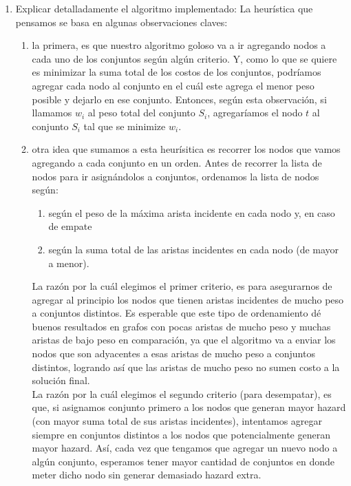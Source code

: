 \documentclass[11pt, a4paper, twoside]{article}
\begin{document}
    \begin{enumerate}
		\item Explicar detalladamente el algoritmo implementado:
		La heurística que pensamos se basa en algunas observaciones claves: 
		\begin{enumerate}
			\item la primera, es que nuestro
			algoritmo goloso va a ir agregando nodos a cada uno de los conjuntos según algún criterio. Y,
			como lo que se quiere es minimizar la suma total de los costos de los conjuntos, podríamos agregar
			cada nodo al conjunto en el cuál este agrega el menor peso posible y dejarlo en ese conjunto. 
			Entonces, según esta observación,
			si llamamos $w_{i}$ al peso total del conjunto $S_{i}$, 
			agregaríamos el nodo $t$ al conjunto $S_{i}$ tal que se minimize $w_{i}$.
						
			\item otra idea que sumamos a esta heurísitica es recorrer los nodos que vamos agregando a
			cada conjunto en un orden. Antes de recorrer la lista de nodos para ir asignándolos a conjuntos,
			ordenamos la lista de nodos según: 
			\begin{enumerate}
				\item según el peso de la máxima arista incidente en cada nodo y, en caso de empate
				\item según la suma total de las aristas incidentes en cada nodo (de mayor a menor).
			\end{enumerate}
			La razón por la cuál elegimos el primer criterio, es para asegurarnos de agregar al principio los nodos
			que tienen aristas incidentes de mucho peso a conjuntos distintos.
			Es esperable que este tipo de ordenamiento dé buenos resultados en grafos con pocas aristas de mucho
			peso y muchas aristas de bajo peso en comparación, ya que el algoritmo va a enviar los nodos 
			que son adyacentes a esas aristas de mucho peso a conjuntos distintos, logrando así que las aristas de
			mucho peso no sumen costo a la solución final. \\
			La razón por la cuál elegimos el segundo criterio (para desempatar), es que, si asignamos conjunto
			primero a los nodos que generan mayor hazard (con mayor suma total de sus aristas incidentes), intentamos
			agregar siempre en conjuntos distintos a los nodos que potencialmente generan mayor hazard. Así, cada vez que 
			tengamos que agregar un nuevo nodo a algún conjunto, esperamos tener mayor cantidad de conjuntos en donde 
			meter dicho nodo sin generar demasiado hazard extra. \\
			

\end{enumerate}
\end{enumerate}
\end{document}
